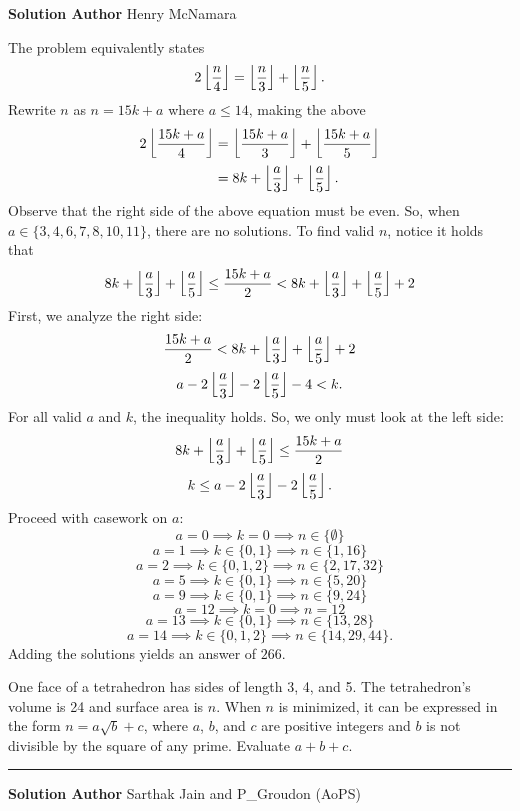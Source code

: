 \documentclass[11pt]{scrartcl}
\newcommand*{\problemfont}{\sffamily\bfseries}
\begin{document}
{\problemfont Solution Author} Henry McNamara

The problem equivalently states
\[2\left\lfloor \frac{n}{4} \right\rfloor = \left\lfloor \frac{n}{3} \right\rfloor + \left\lfloor \frac{n}{5} \right\rfloor.\]
Rewrite $n$ as $n = 15k + a$ where $a \leq 14$, making the above
\begin{align*}
    2\left\lfloor \frac{15k + a}{4} \right\rfloor &= \left\lfloor \frac{15k + a}{3} \right\rfloor + \left\lfloor \frac{15k + a}{5} \right\rfloor \\
    &= 8k + \left\lfloor \frac{a}{3} \right\rfloor + \left\lfloor \frac{a}{5} \right\rfloor.
\end{align*}
Observe that the right side of the above equation must be even. So, when $a \in \{3, 4, 6, 7, 8, 10, 11\}$, there are no solutions. To find valid $n$, notice it holds that
\[8k + \left\lfloor \frac{a}{3} \right\rfloor + \left\lfloor \frac{a}{5} \right\rfloor \leq \frac{15k + a}{2} < 8k + \left\lfloor \frac{a}{3} \right\rfloor + \left\lfloor \frac{a}{5} \right\rfloor + 2\]
First, we analyze the right side:
\[\frac{15k + a}{2} < 8k + \left\lfloor \frac{a}{3} \right\rfloor + \left\lfloor \frac{a}{5} \right\rfloor + 2\]
\[a - 2\left\lfloor \frac{a}{3} \right\rfloor - 2\left\lfloor \frac{a}{5} \right\rfloor - 4 < k.\]
For all valid $a$ and $k$, the inequality holds. So, we only must look at the left side:
\[8k + \left\lfloor \frac{a}{3} \right\rfloor + \left\lfloor \frac{a}{5} \right\rfloor \leq \frac{15k + a}{2}\]
\[k \leq a - 2\left\lfloor \frac{a}{3} \right\rfloor - 2\left\lfloor \frac{a}{5} \right\rfloor.\]
Proceed with casework on $a$:
\[a = 0 \implies k = 0 \implies n \in \{\emptyset\}\]
\[a = 1 \implies k \in \{0, 1\} \implies n \in \{1, 16\}\]
\[a = 2 \implies k \in \{0, 1, 2\} \implies n \in \{2, 17, 32\}\]
\[a = 5 \implies k \in \{0, 1\} \implies n \in \{5, 20\}\]
\[a = 9 \implies k \in \{0, 1\} \implies n \in \{9, 24\}\]
\[a = 12 \implies k = 0 \implies n = 12\]
\[a = 13 \implies k \in \{0, 1\} \implies n \in \{13, 28\}\]
\[a = 14 \implies k \in \{0, 1, 2\} \implies n \in \{14, 29, 44\}.\]
Adding the solutions yields an answer of $\boxed{266}$.

\pagebreak

\begin{problem}
    One face of a tetrahedron has sides of length 3, 4, and 5. The tetrahedron's volume is 24 and surface area is $n$. When $n$ is minimized, it can be expressed in the form $n = a\sqrt{b} + c$, where $a$, $b$, and $c$ are positive integers and $b$ is not divisible by the square of any prime. Evaluate $a + b + c$.
\end{problem}

\vspace{-\baselineskip}\rule{\textwidth}{0.4pt}

{\problemfont Solution Author} Sarthak Jain and P\_Groudon (AoPS)
\end{document}
